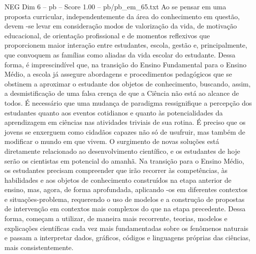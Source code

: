 \begin{textsample}{NEG Dim 6 – pb – Score 1.00 – pb/pb\_em\_65.txt}
Ao se pensar em uma proposta curricular, independentemente da área do conhecimento em questão, devem -se levar em consideração modos de valorização da vida, de motivação educacional, de orientação profissional e de momentos reflexivos que proporcionem maior interação entre estudantes, escola, gestão e, principalmente, que convoquem as famílias como aliadas da vida escolar do estudante.
Dessa forma, é imprescindível que, na transição do Ensino Fundamental para o Ensino Médio, a escola já assegure abordagens e procedimentos pedagógicos que se obstinem a aproximar o estudante dos objetos de conhecimento, buscando, assim, a desmistificação de uma falsa crença de que a Ciência não está ao alcance de todos.
É necessário que uma mudança de paradigma ressignifique a percepção dos estudantes quanto aos eventos cotidianos e quanto às potencialidades da aprendizagem em ciências nas atividades triviais de sua rotina.
É preciso que os jovens se enxerguem como cidadãos capazes não só de usufruir, mas também de modificar o mundo em que vivem.
O surgimento de novas soluções está diretamente relacionado ao desenvolvimento científico, e os estudantes de hoje serão os cientistas em potencial do amanhã.
Na transição para o Ensino Médio, os estudantes precisam compreender que irão recorrer às competências, às habilidades e aos objetos de conhecimento construídos na etapa anterior de ensino, mas, agora, de forma aprofundada, aplicando -os em diferentes contextos e situações-problema, requerendo o uso de modelos e a construção de propostas de intervenção em contextos mais complexos do que na etapa precedente.
Dessa forma, começam a utilizar, de maneira mais recorrente, teorias, modelos e explicações científicas cada vez mais fundamentadas sobre os fenômenos naturais e passam a interpretar dados, gráficos, códigos e linguagens próprias das ciências, mais consistentemente.

\end{textsample}
